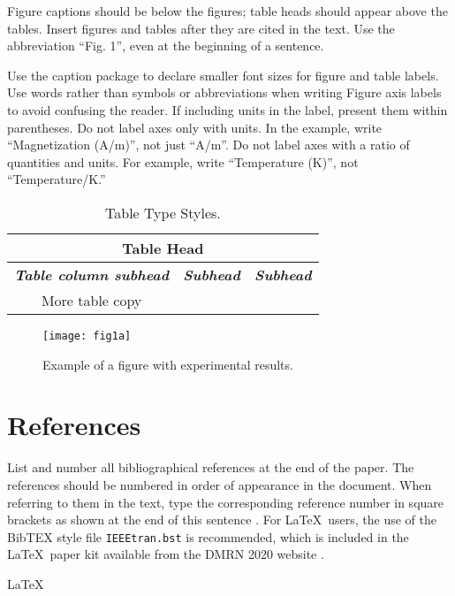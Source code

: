 \documentclass{article}
\begin{document}
\begin{sloppy}
Figure captions should be below the figures; table heads should appear above the tables. Insert figures and tables after they are cited in the text. Use the abbreviation “Fig. 1”, even at the beginning of a sentence.

Use the caption package to declare smaller font sizes for figure and table labels. Use words rather than symbols or abbreviations when writing Figure axis labels to avoid confusing the reader. If including units in the label, present them within parentheses. Do not label axes only with units. In the example, write “Magnetization (A/m)”, not just “A/m”. Do not label axes with a ratio of quantities and units. For example, write “Temperature (K)”, not “Temperature/K.”

\begin{table}[t]
    \centering
    \caption{Table Type Styles.}
    \begin{tabular}{ |c|c|c| } \hline
    \multicolumn{3}{|c|}{\textbf{Table Head}} \\ \hline
    \textbf{\textit{Table column subhead}} & \textbf{\textit{Subhead}} & \textbf{\textit{Subhead}}\\ \hline
    {More table copy} & {} & {} \\ \hline
    \end{tabular}
    \label{modules}
\end{table}

\begin{figure}[t]
  \centering
  \centerline{\texttt{[image: fig1a]}}
  \caption{Example of a figure with experimental results.}
  \label{fig:results}
\end{figure}

\section{References}
List and number all bibliographical references at the end of the paper. The references should be numbered in order of appearance in the document. When referring to them in the text, type the corresponding reference number in square brackets as shown at the end of this sentence \cite{cJones2003, eWilliams1999}. For \LaTeX\ users, the use of the BibTEX style  file  \texttt{IEEEtran.bst} is  recommended,  which  is  included  in  the \LaTeX\ paper kit available from the DMRN 2020 website \cite{dmrn2021}.


\LaTeX{} \cite{latex2e}

{\footnotesize}



\end{sloppy}
\end{document}
